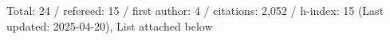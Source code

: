 Total: 24 / refereed: 15 / first author: 4 / citations: 2,052 / h-index: 15 (Last updated: 2025-04-20), List attached below